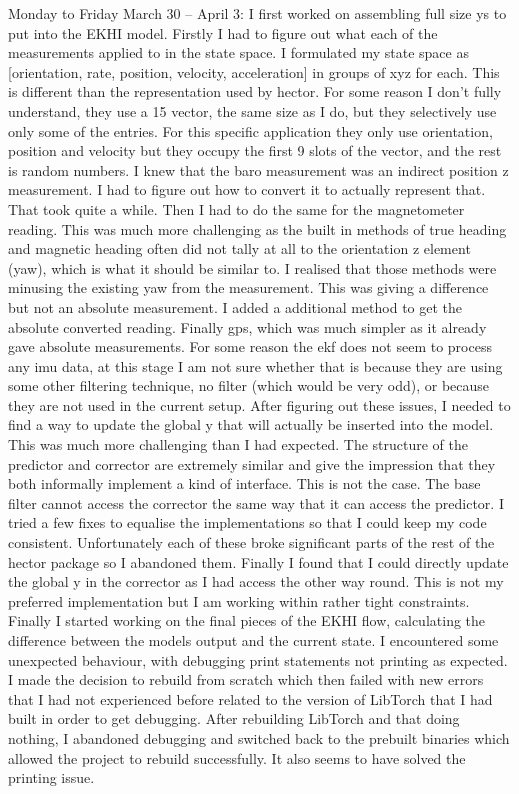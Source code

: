 \documentclass[]{../resources/final_report}
\begin{document}
\begin{appendices}
  Monday to Friday March 30 – April 3: I first worked on assembling full size ys to put into the EKHI model. Firstly I had to figure out what each of the measurements applied to in the state space. I formulated my state space as [orientation, rate, position, velocity, acceleration] in groups of xyz for each. This is different than the representation used by hector. For some reason I don’t fully understand, they use a 15 vector, the same size as I do, but they selectively use only some of the entries. For this specific application they only use orientation, position and velocity but they occupy the first 9 slots of the vector, and the rest is random numbers. I knew that the baro measurement was an indirect position z measurement. I had to figure out how to convert it to actually represent that. That took quite a while. Then I had to do the same for the magnetometer reading. This was much more challenging as the built in methods of true heading and magnetic heading often did not tally at all to the orientation z element (yaw), which is what it should be similar to. I realised that those methods were minusing the existing yaw from the measurement. This was giving a difference but not an absolute measurement. I added a additional method to get the absolute converted reading. Finally gps, which was much simpler as it already gave absolute measurements. For some reason the ekf does not seem to process any imu data, at this stage I am not sure whether that is because they are using some other filtering technique, no filter (which would be very odd), or because they are not used in the current setup. After figuring out these issues, I needed to find a way to update the global y that will actually be inserted into the model. This was much more challenging than I had expected. The structure of the predictor and corrector are extremely similar and give the impression that they both informally implement a kind of interface. This is not the case. The base filter cannot access the corrector the same way that it can access the predictor. I tried a few fixes to equalise the implementations so that I could keep my code consistent. Unfortunately each of these broke significant parts of the rest of the hector package so I abandoned them. Finally I found that I could directly update the global y in the corrector as I had access the other way round. This is not my preferred implementation but I am working within rather tight constraints. Finally I started working on the final pieces of the EKHI flow, calculating the difference between the models output and the current state. I encountered some unexpected behaviour, with debugging print statements not printing as expected. I made the decision to rebuild from scratch which then failed with new errors that I had not experienced before related to the version of LibTorch that I had built in order to get debugging. After rebuilding LibTorch and that doing nothing, I abandoned debugging and switched back to the prebuilt binaries which allowed the project to rebuild successfully. It also seems to have solved the printing issue.


\end{appendices}
\end{document}
